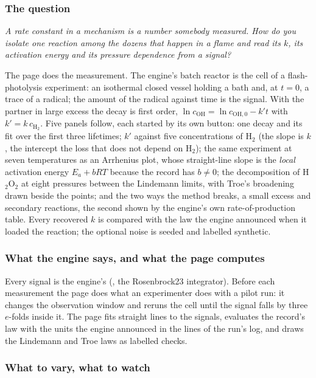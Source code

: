 \documentclass[11pt,a4paper]{article}
\begin{document}
\subsubsection*{The question}

\emph{A rate constant in a mechanism is a number somebody measured.  How do you
isolate one reaction among the dozens that happen in a flame and read its $k$,
its activation energy and its pressure dependence from a signal?}

The page does the measurement.  The engine's batch reactor is the cell of a
flash-photolysis experiment: an isothermal closed vessel holding a bath and, at
$t=0$, a trace of a radical; the amount of the radical against time is the
signal.  With the partner in large excess the decay is first order,
$\ln c_\mathrm{OH} = \ln c_{\mathrm{OH},0} - k' t$ with $k' = k\,c_{\mathrm{H}_2}$.  Five panels
follow, each started by its own button: one decay and its fit over the first
three lifetimes; $k'$ against five concentrations of H$_2$ (the slope is $k$,
the intercept the loss that does not depend on H$_2$); the same experiment at
seven temperatures as an Arrhenius plot, whose straight-line slope is the
\emph{local} activation energy $E_a + bRT$ because the record has $b\neq0$;
the decomposition of H$_2$O$_2$ at eight pressures between the Lindemann limits,
with Troe's broadening drawn beside the points; and the two ways the method
breaks, a small excess and secondary reactions, the second shown by the
engine's own rate-of-production table.  Every recovered $k$ is compared with
the law the engine announced when it loaded the reaction; the optional noise is
seeded and labelled synthetic.

\subsubsection*{What the engine says, and what the page computes}

Every signal is the engine's (, the Rosenbrock23 integrator).
Before each measurement the page does what an experimenter does with a pilot
run: it changes the observation window and reruns the cell until the signal
falls by three $e$-folds inside it.  The page fits straight lines to the
signals, evaluates the record's law with the units the engine announced in the
\code{[kinetics]} lines of the run's log, and draws the Lindemann and Troe
laws as labelled checks.

\subsubsection*{What to vary, what to watch}
\end{document}
